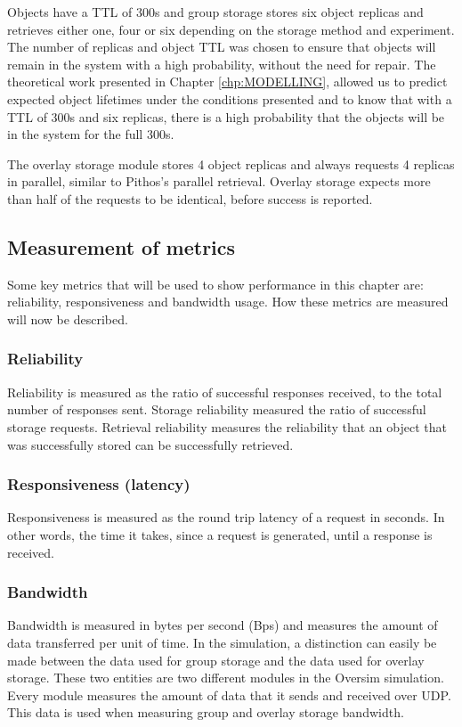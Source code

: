 Objects have a TTL of 300s and group storage stores six object replicas and retrieves either one, four or six depending on the storage method and experiment. The number of replicas and object TTL was chosen to ensure that objects will remain in the system with a high probability, without the need for repair. The theoretical work presented in Chapter \ref{chp:MODELLING}, allowed us to predict expected object lifetimes under the conditions presented and to know that with a TTL of 300s and six replicas, there is a high probability that the objects will be in the system for the full 300s.

The overlay storage module stores 4 object replicas and always requests 4 replicas in parallel, similar to Pithos's parallel retrieval. Overlay storage expects more than half of the requests to be identical, before success is reported.

\subsection{Measurement of metrics}

Some key metrics that will be used to show performance in this chapter are: reliability, responsiveness and bandwidth usage. How these metrics are measured will now be described.

\subsubsection{Reliability}
Reliability is measured as the ratio of successful responses received, to the total number of responses sent. Storage reliability measured the ratio of successful storage requests. Retrieval reliability measures the reliability that an object that was successfully stored can be successfully retrieved.

\subsubsection{Responsiveness (latency)}

Responsiveness is measured as the round trip latency of a request in seconds.  In other words, the time it takes, since a request is generated, until a response is received.

\subsubsection{Bandwidth}

Bandwidth is measured in bytes per second (Bps) and measures the amount of data transferred per unit of time. In the simulation, a distinction can easily be made between the data used for group storage and the data used for overlay storage. These two entities are two different modules in the Oversim simulation. Every module measures the amount of data that it sends and received over UDP. This data is used when measuring group and overlay storage bandwidth.


